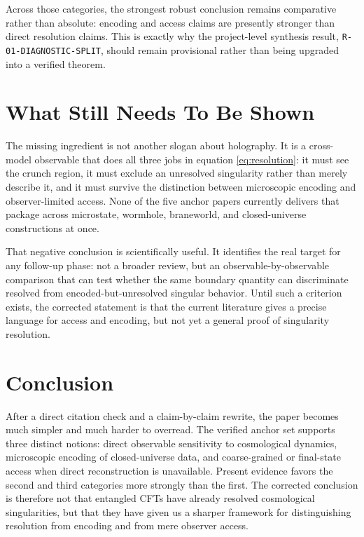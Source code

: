 \documentclass[11pt]{article}
\begin{document}
Across those categories, the strongest robust conclusion remains comparative rather than absolute: encoding and access claims are presently stronger than direct resolution claims. This is exactly why the project-level synthesis result, \texttt{R-01-DIAGNOSTIC-SPLIT}, should remain provisional rather than being upgraded into a verified theorem.

\section{What Still Needs To Be Shown}

The missing ingredient is not another slogan about holography. It is a cross-model observable that does all three jobs in equation \eqref{eq:resolution}: it must see the crunch region, it must exclude an unresolved singularity rather than merely describe it, and it must survive the distinction between microscopic encoding and observer-limited access. None of the five anchor papers currently delivers that package across microstate, wormhole, braneworld, and closed-universe constructions at once.

That negative conclusion is scientifically useful. It identifies the real target for any follow-up phase: not a broader review, but an observable-by-observable comparison that can test whether the same boundary quantity can discriminate resolved from encoded-but-unresolved singular behavior. Until such a criterion exists, the corrected statement is that the current literature gives a precise language for access and encoding, but not yet a general proof of singularity resolution.

\section{Conclusion}

After a direct citation check and a claim-by-claim rewrite, the paper becomes much simpler and much harder to overread. The verified anchor set supports three distinct notions: direct observable sensitivity to cosmological dynamics, microscopic encoding of closed-universe data, and coarse-grained or final-state access when direct reconstruction is unavailable. Present evidence favors the second and third categories more strongly than the first. The corrected conclusion is therefore not that entangled CFTs have already resolved cosmological singularities, but that they have given us a sharper framework for distinguishing resolution from encoding and from mere observer access.



\end{document}
